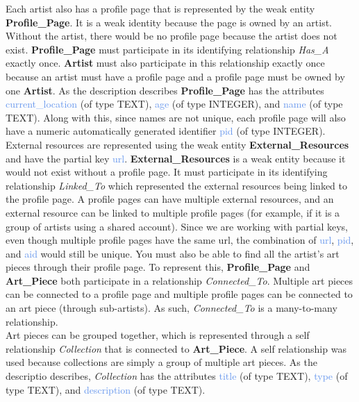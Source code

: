 \documentclass[11pt]{article}
\begin{document}
Each artist also has a profile page that is represented by the weak entity \textbf{Profile\_Page}. It is a weak identity because the page is owned by an artist. Without the artist, there would be no profile page because the artist does not exist. \textbf{Profile\_Page} must participate in its identifying relationship \textit{Has\_A} exactly once. \textbf{Artist} must also participate in this relationship exactly once because an artist must have a profile page and a profile page must be owned by one \textbf{Artist}. As the description describes \textbf{Profile\_Page} has the attributes \textcolor{CornflowerBlue}{current\_location} (of type TEXT), \textcolor{CornflowerBlue}{age} (of type INTEGER), and \textcolor{CornflowerBlue}{name} (of type TEXT). Along with this, since names are not unique, each profile page will also have a numeric automatically generated identifier \textcolor{CornflowerBlue}{pid} (of type INTEGER). External resources are represented using the weak entity \textbf{External\_Resources} and have the partial key \textcolor{CornflowerBlue}{url}. \textbf{External\_Resources} is a weak entity because it would not exist without a profile page. It must participate in its identifying relationship \textit{Linked\_To} which represented the external resources being linked to the profile page. A profile pages can have multiple external resources, and an external resource can be linked to multiple profile pages (for example, if it is a group of artists using a shared account). Since we are working with partial keys, even though multiple profile pages have the same url, the combination of \textcolor{CornflowerBlue}{url}, \textcolor{CornflowerBlue}{pid}, and \textcolor{CornflowerBlue}{aid} would still be unique. You must also be able to find all the artist's art pieces through their profile page. To represent this, \textbf{Profile\_Page} and \textbf{Art\_Piece} both participate in a relationship \textit{Connected\_To}. Multiple art pieces can be connected to a profile page and multiple profile pages can be connected to an art piece (through sub-artists). As such, \textit{Connected\_To} is a many-to-many relationship. \\

Art pieces can be grouped together, which is represented through a self relationship \textit{Collection} that is connected to \textbf{Art\_Piece}. A self relationship was used because collections are simply a group of multiple art pieces. As the descriptio describes, \textit{Collection} has the attributes \textcolor{CornflowerBlue}{title} (of type TEXT), \textcolor{CornflowerBlue}{type} (of type TEXT), and \textcolor{CornflowerBlue}{description} (of type TEXT). \\
\end{document}

